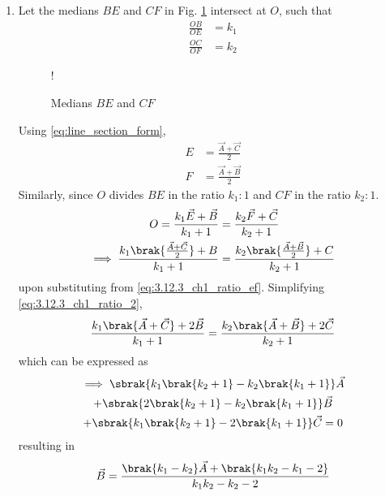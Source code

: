 \renewcommand{\theequation}{\theenumi}
\begin{enumerate}[label=\thesection.\arabic*.,ref=\thesection.\theenumi]
\item Let the medians $BE$ and $CF$ in Fig. \ref{fig:3.12.3_ch1_two_median} intersect at $O$, such that
\begin{equation}
\begin{split}
\frac{OB}{OE} &= k_1
\\
\frac{OC}{OF} &= k_2
\end{split}
\end{equation}
%
\begin{figure}[!h]
\centering
\resizebox {\columnwidth} {!} {

}
\caption{Medians $BE$ and $CF$}
\label{fig:3.12.3_ch1_two_median}
\end{figure}
Using \eqref{eq:line_section_form},
%
\begin{align}
E &= \frac{\vec{A}+\vec{C}}{2} 
\\
F &= \frac{\vec{A}+\vec{B}}{2} 
\label{eq:3.12.3_ch1_ratio_ef}
\end{align}
%
Similarly, since $O$ divides $BE$ in the ratio $k_1:1$ and $CF$ in the ratio $k_2:1$.
\begin{align}
O = \frac{k_1\vec{E}+\vec{B}}{k_1+1} &=  \frac{k_2\vec{F}+\vec{C}}{k_2+1} 
\\
\implies \frac{k_1\brak{\frac{\vec{A}+\vec{C}}{2}} +B}{k_1+1} &=  \frac{k_2\brak{\frac{\vec{A}+\vec{B}}{2} }+C}{k_2+1} 
\label{eq:3.12.3_ch1_ratio_2}
\end{align}
upon substituting from \eqref{eq:3.12.3_ch1_ratio_ef}.
Simplifying \eqref{eq:3.12.3_ch1_ratio_2},
\begin{align}
\frac{k_1\brak{\vec{A}+\vec{C}} +2\vec{B}}{k_1+1} =  \frac{k_2\brak{\vec{A}+\vec{B}}+2\vec{C}}{k_2+1} 
\end{align}
which can be expressed as
\begin{multline}
\implies \sbrak{k_1\brak{k_2+1}-k_2\brak{k_1+1}}\vec{A}
\\
 +\sbrak{2\brak{k_2+1}-k_2\brak{k_1+1}}\vec{B}
\\ +  \sbrak{k_1\brak{k_2+1} -2\brak{k_1+1}}\vec{C} = 0
\end{multline}
resulting in 
\begin{align}
\vec{B} = \frac{\brak{k_1-k_2}\vec{A}+\brak{k_1k_2 -k_1 -2}}{k_1k_2 -k_2 -2}

\end{align}
\end{enumerate}
